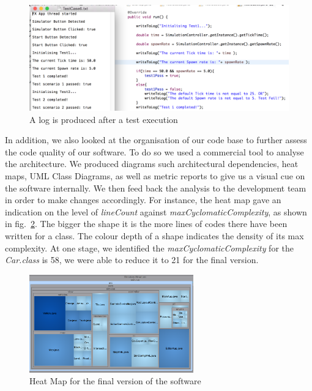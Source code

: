 \begin{figure}[h]
	\begin{center}
		\includegraphics[width=\textwidth]{img/testCase.png}
		\caption{A log is produced after a test execution}
	\label{fig:testCase}
	\end{center}
\end{figure}

In addition, we also looked at the organisation of our code base to further assess the code quality of our software.  To do so we used a commercial tool to analyse the architecture. We produced diagrams such architectural dependencies, heat maps, UML Class Diagrams, as well as metric reports to give us a visual cue on the software internally. We then feed back the analysis to the development team in order to make changes accordingly. For instance, the heat map gave an indication on the level of \textit{lineCount} against \textit{maxCyclomaticComplexity}, as shown in fig.~\ref{fig:heatmap}. The bigger the shape it is the more lines of codes there have been written for a class. The colour depth of a shape indicates the density of its max complexity. At one stage, we identified the \textit{maxCyclomaticComplexity} for the \textit{Car.class} is 58, we were able to reduce it to 21 for the final version.     

\begin{figure}[h]
	\begin{minipage}{\textwidth}
		\begin{center}
				\includegraphics[width=71mm,keepaspectratio ]{img/heatmap.png}
			\caption{Heat Map for the final version of the software}
			\label{fig:heatmap}	
		\end{center}
	\end{minipage}
\end{figure}

